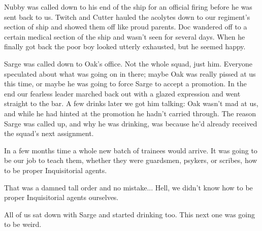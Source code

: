 Nubby was called down to his end of the ship for an official firing before he was sent back to us. 
Twitch and Cutter hauled the acolytes down to our regiment’s section of ship and showed them off like proud parents. 
Doc wandered off to a certain medical section of the ship and wasn’t seen for several days. 
When he finally got back the poor boy looked utterly exhausted, but he seemed happy.

Sarge was called down to Oak’s office. 
Not the whole squad, just him. 
Everyone speculated about what was going on in there; 
maybe Oak was really pissed at us this time, or maybe he was going to force Sarge to accept a promotion. 
In the end our fearless leader marched back out with a glazed expression and went straight to the bar. 
A few drinks later we got him talking: 
Oak wasn’t mad at us, and while he had hinted at the promotion he hadn’t carried through. 
The reason Sarge was called up, and why he was drinking, was because he’d already received the squad’s next assignment.

In a few months time a whole new batch of trainees would arrive. 
It was going to be our job to teach them, whether they were guardsmen, psykers, or scribes, how to be proper Inquisitorial agents. 


That was a damned tall order and no mistake... 
Hell, we didn’t know how to be proper Inquisitorial agents ourselves.

All of us sat down with Sarge and started drinking too. 
This next one was going to be weird.
